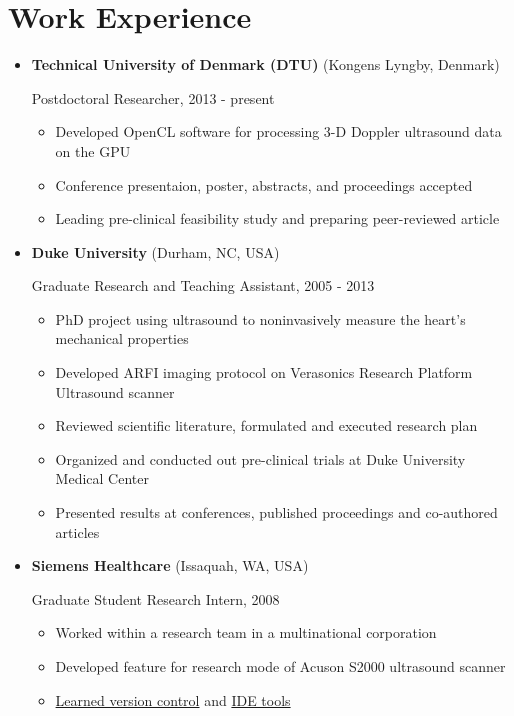 \documentclass[letterpaper,10pt,english]{sphinxmanual}
\begin{document}
\chapter{Work Experience}
\label{resume:work-experience}\begin{itemize}
\item {} 
\textbf{Technical University of Denmark (DTU)} (Kongens Lyngby, Denmark)

Postdoctoral Researcher, 2013 - present
\begin{itemize}
\item {} 
Developed OpenCL software for processing 3-D Doppler ultrasound
data on the GPU

\item {} 
Conference presentaion, poster, abstracts, and proceedings
accepted

\item {} 
Leading pre-clinical feasibility study and preparing peer-reviewed
article

\end{itemize}

\item {} 
\textbf{Duke University} (Durham, NC, USA)

Graduate Research and Teaching Assistant, 2005 - 2013
\begin{itemize}
\item {} 
PhD project using ultrasound to noninvasively measure the heart's
mechanical properties

\item {} 
Developed ARFI imaging protocol on Verasonics Research Platform
Ultrasound scanner

\item {} 
Reviewed scientific literature, formulated and executed research
plan

\item {} 
Organized and conducted out pre-clinical trials at Duke University
Medical Center

\item {} 
Presented results at conferences, published proceedings and
co-authored articles

\end{itemize}

\item {} 
\textbf{Siemens Healthcare} (Issaquah, WA, USA)

Graduate Student Research Intern, 2008
\begin{itemize}
\item {} 
Worked within a research team in a multinational corporation

\item {} 
Developed feature for research mode of Acuson S2000 ultrasound
scanner

\item {} 
\href{http://www-03.ibm.com/software/products/en/clearcase}{Learned version
control}
and \href{http://www.visualstudio.com/}{IDE tools}

\end{itemize}

\end{itemize}
\end{document}
